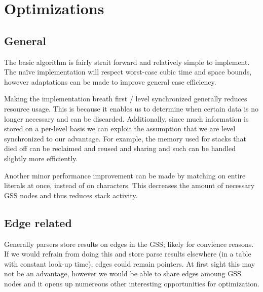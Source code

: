 \documentclass[a4paper,10pt]{article}
\begin{document}
\section{Optimizations}

\subsection{General}

The basic algorithm is fairly strait forward and relatively simple to implement. The naïve implementation will respect worst-case cubic time and space bounds, however adaptations can be made to improve general case efficiency.

Making the implementation breath first / level synchronized generally reduces resource usage. This is because it enables us to determine when certain data is no longer necessary and can be discarded. Additionally, since much information is stored on a per-level basis we can exploit the assumption that we are level synchronized to our advantage. For example, the memory used for stacks that died off can be reclaimed and reused and sharing and such can be handled slightly more efficiently.

Another minor performance improvement can be made by matching on entire literals at once, instead of on characters. This decreases the amount of necessary GSS nodes and thus reduces stack activity.

\subsection{Edge related}

Generally parsers store results on edges in the GSS; likely for convience reasons. If we would refrain from doing this and store parse results elsewhere (in a table with constant look-up time), edges could remain pointers. At first sight this may not be an advantage, however we would be able to share edges amoung GSS nodes and it opens up numereous other interesting opportunities for optimization.
\end{document}

